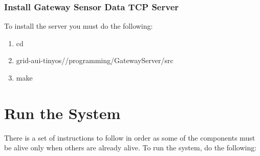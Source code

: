 \documentclass[oneside,12pt,a4paper,final]{book}
\begin{document}
\subsection{Install Gateway Sensor Data TCP Server}
To install the server you must do the following:
\begin{enumerate}
\item cd
\item grid-aui-tinyos//programming/GatewayServer/src
\item make
\end{enumerate}

\chapter{Run the System}
There is a set of instructions to follow in order as some of the components must be alive only when others are already alive. To run the system, do the following:
\end{document}
